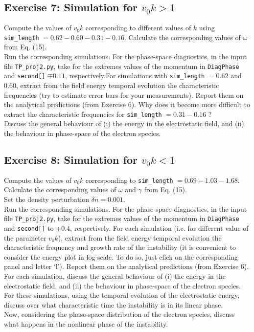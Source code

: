\documentclass[11pt,a4paper]{article}
\begin{document}
\subsection*{Exercise 7: Simulation for $v_0 k > 1$}

 Compute the values of $v_0 k$ corresponding to different values of $k$ using \\ \texttt{sim\_length} $= 0.62 - 0.60- 0.31 - 0.16$. Calculate the corresponding values of $\omega$ from Eq. (15).\\
 Run the corresponding simulations.  For the phase-space diagnostics, in the input file \texttt{TP\_proj2.py}, take for the extremes values of the momentum in \texttt{DiagPhase} and \texttt{second[]}  $\mp 0.11$, respectively.For simulations with \texttt{sim\_length} $= 0.62$ and $0.60$, extract from the field energy temporal evolution the characteristic frequencies (try to estimate error bars for your measurements). Report them on the analytical predictions (from Exercise 6). Why does it become more difficult to extract the characteristic frequencies for \texttt{sim\_length} $= 0.31 - 0.16$ ?\\
 Discuss the general behaviour of (i) the energy in the electrostatic field, and (ii) the behaviour in phase-space of the electron species. \\

\subsection*{Exercise 8: Simulation for $v_0 k < 1$}

  Compute the values of $v_0 k$ corresponding to \texttt{sim\_length} $= 0.69 - 1.03 - 1.68$. Calculate the corresponding values of $\omega$ and $\gamma$ from Eq. (15).\\Set the density perturbation $\delta n = 0.001$. \\
 Run the corresponding simulations. For the phase-space diagnostics, in the input file \texttt{TP\_proj2.py},  take for the extremes values of the momentum in \texttt{DiagPhase} and \texttt{second[]}   to $\pm 0.4$, respectively. For each simulation (i.e. for different value of the parameter $v_0 k$), extract from the field energy temporal evolution the characteristic frequency and growth rate of the instability (it is convenient to consider the energy plot in log-scale. To do so, just click on the corresponding panel and letter `l'). Report them on the analytical predictions (from Exercise 6).\\
 For each simulation, discuss the general behaviour of (i) the energy in the electrostatic field, and (ii) the behaviour in phase-space of the electron species. \\
 For these simulations, using the temporal evolution of the electrostatic energy, discuss over what characteristic time the instability is in its linear phase.\\
 Now, considering the phase-space distribution of the electron species, discuss what happens in the nonlinear phase of the instability.
\end{document}
